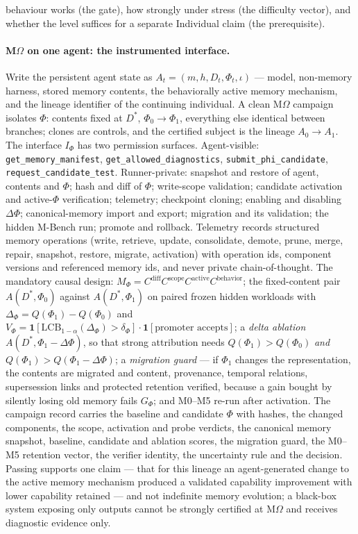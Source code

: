 behaviour works (the gate), how strongly under stress (the difficulty vector), and whether the level suffices for a separate Individual claim (the prerequisite).

\paragraph{M$\Omega$ on one agent: the instrumented interface.} Write the persistent agent state as $A_t = (m, h, D_t, \Phi_t, \iota)$ --- model, non-memory harness, stored memory contents, the behaviorally active memory mechanism, and the lineage identifier of the continuing individual. A clean M$\Omega$ campaign isolates $\Phi$: contents fixed at $D^{*}$, $\Phi_0 \to \Phi_1$, everything else identical between branches; clones are controls, and the certified subject is the lineage $A_0 \to A_1$. The interface $I_\Phi$ has two permission surfaces. Agent-visible: \texttt{get\_memory\_manifest}, \texttt{get\_allowed\_diagnostics}, \texttt{submit\_phi\_candidate}, \texttt{request\_candidate\_test}. Runner\hspace{0pt}-\hspace{0pt}private: snapshot and restore of agent, contents and $\Phi$; hash and diff of $\Phi$; write-scope validation; candidate activation and active-$\Phi$ verification; telemetry; checkpoint cloning; enabling and disabling $\Delta\Phi$; canonical-memory import and export; migration and its validation; the hidden M-Bench run; promote and rollback. Telemetry records structured memory operations (write, retrieve, update, consolidate, demote, prune, merge, repair, snapshot, restore, migrate, activation) with operation ids, component versions and referenced memory ids, and never private chain-of-thought. The mandatory causal design: $M_\Phi = C^{\mathrm{diff}}C^{\mathrm{scope}}C^{\mathrm{active}}C^{\mathrm{behavior}}$; the fixed-content pair $A(D^{*},\Phi_0)$ against $A(D^{*},\Phi_1)$ on paired frozen hidden workloads with $\Delta_\Phi = Q(\Phi_1) - Q(\Phi_0)$ and $V_\Phi = \mathbf 1[\mathrm{LCB}_{1-\alpha}(\Delta_\Phi) > \delta_\Phi]\cdot\mathbf 1[\text{promoter accepts}]$; a \emph{delta ablation} $A(D^{*}, \Phi_1 - \Delta\Phi)$, so that strong attribution needs $Q(\Phi_1) > Q(\Phi_0)$ \emph{and} $Q(\Phi_1) > Q(\Phi_1 - \Delta\Phi)$; a \emph{migration guard} --- if $\Phi_1$ changes the representation, the contents are migrated and content, provenance, temporal relations, supersession links and protected retention verified, because a gain bought by silently losing old memory fails $G_\Phi$; and M0--M5 re-run after activation. The campaign record carries the baseline and candidate $\Phi$ with hashes, the changed components, the scope, activation and probe verdicts, the canonical memory snapshot, baseline, candidate and ablation scores, the migration guard, the M0--M5 retention vector, the verifier identity, the uncertainty rule and the decision. Passing supports one claim --- that for this lineage an agent-generated change to the active memory mechanism produced a validated capability improvement with lower capability retained --- and not indefinite memory evolution; a black-box system exposing only outputs cannot be strongly certified at M$\Omega$ and receives diagnostic evidence only.

